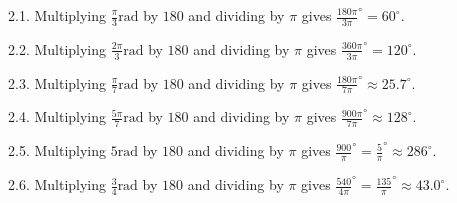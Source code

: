 \documentclass[
  12pt,
  a4paper, oneside]{starmastarticle}
\begin{document}
2.1. Multiplying \(\frac{\pi}{3} \textrm{rad}\) by \(180\) and dividing
by \(\pi\) gives \(\frac{180\pi}{3\pi} ^\circ = 60 ^\circ\).

2.2. Multiplying \(\frac{2\pi}{3}\textrm{rad}\) by \(180\) and dividing
by \(\pi\) gives \(\frac{360\pi}{3\pi} ^\circ = 120 ^\circ\).

2.3. Multiplying \(\frac{\pi}{7} \textrm{rad}\) by \(180\) and dividing
by \(\pi\) gives \(\frac{180\pi}{7\pi} ^\circ \approx 25.7 ^\circ\).

2.4. Multiplying \(\frac{5\pi}{7}\textrm{rad}\) by \(180\) and dividing
by \(\pi\) gives \(\frac{900\pi}{7\pi} ^\circ \approx 128 ^\circ\).

2.5. Multiplying \(5\textrm{rad}\) by \(180\) and dividing by \(\pi\)
gives
\(\frac{900}{\pi} ^\circ = \frac{5}{\pi} ^\circ \approx 286 ^\circ\).

2.6. Multiplying \(\frac{3}{4} \textrm{rad}\) by \(180\) and dividing by
\(\pi\) gives
\(\frac{540}{4\pi} ^\circ = \frac{135}{\pi} ^\circ \approx 43.0 ^\circ\).
\end{document}
